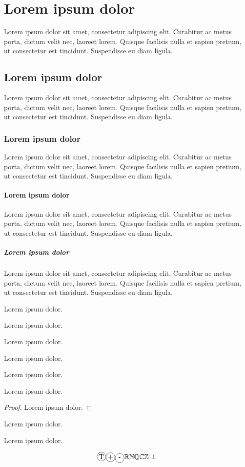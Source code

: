 \newcommand{\lorem}{Lorem ipsum dolor sit amet, consectetur adipiscing elit. Curabitur ac metus porta, dictum velit nec, laoreet lorem. Quisque facilisis nulla et sapien pretium, ut consectetur est tincidunt. Suspendisse eu diam ligula.}

\section{Lorem ipsum dolor}
\lorem

\subsection{Lorem ipsum dolor}
\lorem
\subsubsection{Lorem ipsum dolor}
\lorem
\paragraph{Lorem ipsum dolor}
\lorem
\subparagraph{Lorem ipsum dolor}
\lorem

\begin{definition}
    Lorem ipsum dolor.
\end{definition}

\begin{propriety}
    Lorem ipsum dolor.
\end{propriety}

\begin{proposition}
    Lorem ipsum dolor.
\end{proposition}

\begin{theorem}
    Lorem ipsum dolor.
\end{theorem}

\begin{corollary}
    Lorem ipsum dolor.
\end{corollary}

\begin{lemma}
    Lorem ipsum dolor.
\end{lemma}

\begin{proof}
    Lorem ipsum dolor.
\end{proof}

\begin{example}
    Lorem ipsum dolor.
\end{example}

\begin{remark}
    Lorem ipsum dolor.
\end{remark}

$$\circled{T} \cplus \cminus \R \N \Q \C \Z \independant$$

